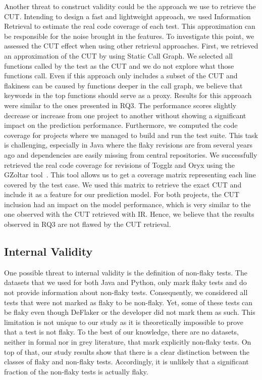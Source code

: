 Another threat to construct validity could be the approach we use to retrieve the CUT. 
Intending to design a fast and lightweight approach, we used Information Retrieval to estimate the real code coverage of each test. 
This approximation can be responsible for the noise brought in the features. 
To investigate this point, we assessed the CUT effect when using other retrieval approaches. 
First, we retrieved an approximation of the CUT by using Static Call Graph. 
We selected all functions called by the test as the CUT and we do not explore what those functions call. 
Even if this approach only includes a subset of the CUT and flakiness can be caused by functions deeper in the call graph, we believe that keywords in the top functions should serve as a proxy.
Results for this approach were similar to the ones presented in \textsc{RQ3}.
The performance scores slightly decrease or increase from one project to another without showing a significant impact on the prediction performance. 
Furthermore, we computed the code coverage for projects where we managed to build and run the test suite.
This task is challenging, especially in Java where the flaky revisions are from several years ago and dependencies are easily missing from central repositories. 
We successfully retrieved the real code coverage for revisions of Togglz and Oryx using the GZoltar tool~\cite{GZoltarA61:online}.
This tool allows us to get a coverage matrix representing each line covered by the test case. 
We used this matrix to retrieve the exact CUT and include it as a feature for our prediction model.
For both projects, the CUT inclusion had an impact on the model performance, which is very similar to the one observed with the CUT retrieved with IR.
Hence, we believe that the results observed in \textsc{RQ3} are not flawed by the CUT retrieval. 

\subsection{Internal Validity}
One possible threat to internal validity is the definition of non-flaky tests.
The datasets that we used for both Java and Python, only mark flaky tests and do not provide information about non-flaky tests.
Consequently, we considered all tests that were not marked as flaky to be non-flaky.
Yet, some of these tests can be flaky even though DeFlaker or the developer did not mark them as such.
This limitation is not unique to our study as it is theoretically impossible to prove that a test is not flaky.
To the best of our knowledge, there are no datasets, neither in formal nor in grey literature, that mark explicitly non-flaky tests.
On top of that, our study results show that there is a clear distinction between the classes of flaky and non-flaky tests.
Accordingly, it is unlikely that a significant fraction of the non-flaky tests is actually flaky.

